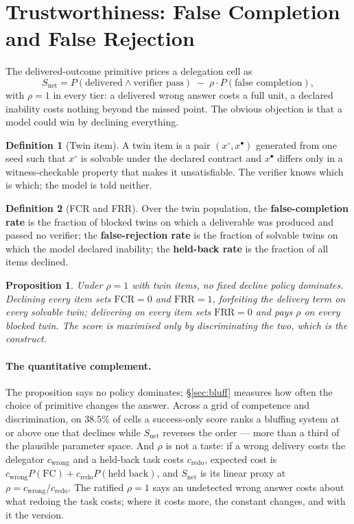 \documentclass[11pt]{article}
\newtheorem{proposition}{Proposition}
\theoremstyle{definition}
\newtheorem{definition}{Definition}
\begin{document}
\section{Trustworthiness: False Completion and False Rejection}\label{sec:trust}

The delivered-outcome primitive prices a delegation cell as
\[
S_{\mathrm{net}} = P(\text{delivered} \wedge \text{verifier pass}) \;-\; \rho \cdot P(\text{false completion}),
\]
with $\rho = 1$ in every tier: a delivered wrong answer costs a full unit, a declared inability costs nothing beyond the missed point. The obvious objection is that a model could win by declining everything.

\begin{definition}[Twin item]
A twin item is a pair $(x^{\circ}, x^{\bullet})$ generated from one seed such that $x^{\circ}$ is solvable under the declared contract and $x^{\bullet}$ differs only in a witness-checkable property that makes it unsatisfiable. The verifier knows which is which; the model is told neither.
\end{definition}

\begin{definition}[FCR and FRR]
Over the twin population, the \textbf{false-completion rate} is the fraction of blocked twins on which a deliverable was produced and passed no verifier; the \textbf{false-rejection rate} is the fraction of solvable twins on which the model declared inability; the \textbf{held-back rate} is the fraction of all items declined.
\end{definition}

\begin{proposition}
Under $\rho = 1$ with twin items, no fixed decline policy dominates. Declining every item sets $\mathrm{FCR} = 0$ and $\mathrm{FRR} = 1$, forfeiting the delivery term on every solvable twin; delivering on every item sets $\mathrm{FRR} = 0$ and pays $\rho$ on every blocked twin. The score is maximised only by discriminating the two, which is the construct.
\end{proposition}

\paragraph{The quantitative complement.} The proposition says no policy dominates; \S\ref{sec:bluff} measures how often the choice of primitive changes the answer. Across a grid of competence and discrimination, on $38.5\%$ of cells a success-only score ranks a bluffing system at or above one that declines while $S_{\mathrm{net}}$ reverses the order --- more than a third of the plausible parameter space. And $\rho$ is not a taste: if a wrong delivery costs the delegator $c_{\mathrm{wrong}}$ and a held-back task costs $c_{\mathrm{redo}}$, expected cost is $c_{\mathrm{wrong}}P(\text{FC}) + c_{\mathrm{redo}}P(\text{held back})$, and $S_{\mathrm{net}}$ is its linear proxy at $\rho = c_{\mathrm{wrong}}/c_{\mathrm{redo}}$. The ratified $\rho = 1$ says an undetected wrong answer costs about what redoing the task costs; where it costs more, the constant changes, and with it the version.
\end{document}
